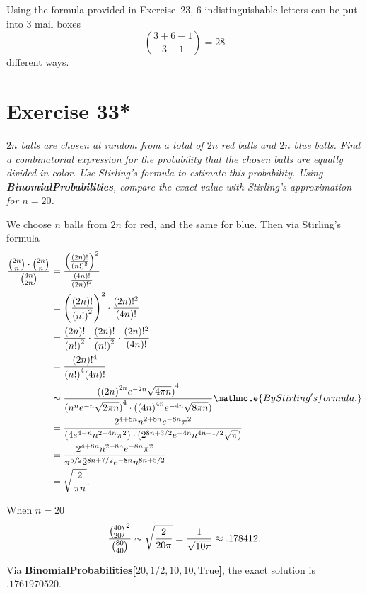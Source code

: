 \documentclass{abrice}
\begin{document}
\bigskip

Using the formula provided in Exercise~23, $6$ indistinguishable
letters can be put into $3$ mail boxes
\begin{equation*}
  {3 + 6 - 1 \choose 3 - 1 } = 28
\end{equation*}
different ways.

\section{Exercise 33*}

\emph{$2n$ balls are chosen at random from a total of $2n$ red balls
  and $2n$ blue balls.  Find a combinatorial expression for the
  probability that the chosen balls are equally divided in color.  Use
  Stirling's formula to estimate this probability.  Using
  \textbf{BinomialProbabilities}, compare the exact value with
  Stirling's approximation for $n = 20$.}

\bigskip

We choose $n$ balls from $2n$ for red, and the same for blue. Then via
Stirling's formula
\begin{align*}
  { {2n \choose n} \cdot {2n \choose n} \over {4n \choose 2n}}
  &= { {\left( (2n)! \over {(n!)}^2 \right) }^2 \over {(4n)! \over
    {(2n)!}^2}}\\
  &= {\left( (2n)! \over {(n!)}^2 \right) }^2 \cdot { (2n)!^2 \over
    (4n)! }\\
  &= { (2n)! \over {(n!)}^2 } \cdot {(2n)! \over
    {(n!)}^2 } \cdot { (2n)!^2 \over (4n)! }\\
  &= { (2n)!^4 \over {(n!)}^4(4n)! }\\
  &\sim {{ ( {(2n)}^{2n} e^{-2n} \sqrt{ 4 \pi n} ) }^4 \over {(n^n e^{-n}
    \sqrt{2 \pi n})}^4 \cdot ( {(4n)}^{4n} e^{-4n} \sqrt{8 \pi
    n})}\mathnote{By Stirling's formula.}\\
  &= { 2^{4+8n} n^{2+8n} e^{-8n} \pi^2 \over (4 e^{4-n} n^{2+4n} \pi^2)
    \cdot (2^{8 n+3/2} e^{-4 n} n^{4 n+1/2} \sqrt{\pi})}\\
  &= { 2^{4+8n} n^{2+8n} e^{-8n} \pi^2 \over \pi^{5/2} 2^{8 n+7/2}
    e^{-8 n} n^{8 n+5/2}}\\
  &= \sqrt{2 \over \pi n}.
\end{align*}

When $n = 20$
\[
{{40 \choose 20}^2 \over {80 \choose 40}} \sim \sqrt{2 \over 20 \pi} =
{1 \over \sqrt{10 \pi}} \approx .178412.
\]

Via \textbf{BinomialProbabilities[$20,1/2,10,10,\mathrm{True}$]}, the
exact solution is $.1761970520$.
\end{document}
